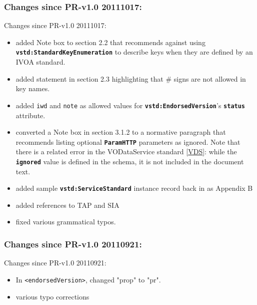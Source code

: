 \documentclass[11pt,a4paper]{ivoa}
\begin{document}
{{\subsubsection{Changes since PR-v1.0 20111017:}
Changes since PR-v1.0 20111017:
\begin{itemize}

\item  added Note box to section 2.2 that recommends against using 
       \textbf{\texttt{vstd:StandardKeyEnumeration}} to
       describe keys when they are defined by an IVOA standard. {}

\item  added statement in section 2.3 highlighting that # signs are
       not allowed in key names. {}

\item  added \texttt{iwd} and \texttt{note} as allowed values
       for \textbf{\texttt{vstd:EndorsedVersion}}'s
       \textbf{\texttt{status}} attribute. {}

\item  converted a Note box in section 3.1.2 to a normative paragraph
       that recommends listing optional \textbf{\texttt{ParamHTTP}}
       parameters as ignored.  Note that there is a related error in
       the VODataService standard [\href{#r:vds}{VDS}]: while
       the \textbf{\texttt{ignored}} value is defined in
       the schema, it is not included in the document text.{}

\item  added sample \textbf{\texttt{vstd:ServiceStandard}} 
       instance record back in as Appendix B {}

\item  added references to TAP and SIA {}

\item  fixed various grammatical typos. {}

\end{itemize}

\subsubsection{Changes since PR-v1.0 20110921:}
Changes since PR-v1.0 20110921:
\begin{itemize}

\item  In \texttt{<endorsedVersion>}, changed "prop" to "pr". {}

\item  various typo corrections {}


\end{itemize}}}
\end{document}
